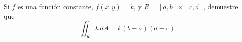\item Si $f$ es una función constante, $f(x, y) = k$, y $R = [a, b] \times [c, d]$, demuestre que
\[ \iint_R k \, dA = k(b - a)(d - c) \]
